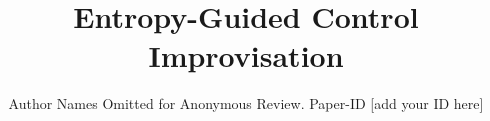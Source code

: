 \documentclass[conference]{IEEEtran}
\theoremstyle{remark}
\begin{document}
\title{Entropy-Guided Control Improvisation}

\author{Author Names Omitted for Anonymous Review. Paper-ID [add your ID here]}





% 


\maketitle
\end{document}
